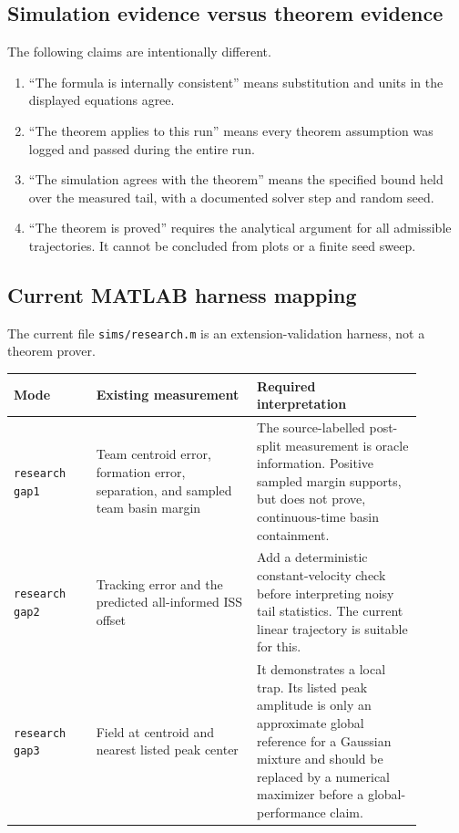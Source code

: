 \documentclass[11pt]{article}
\begin{document}
\subsection{Simulation evidence versus theorem evidence}

The following claims are intentionally different.
\begin{enumerate}
    \item ``The formula is internally consistent'' means substitution and units in the displayed equations agree.
    \item ``The theorem applies to this run'' means every theorem assumption was logged and passed during the entire run.
    \item ``The simulation agrees with the theorem'' means the specified bound held over the measured tail, with a documented solver step and random seed.
    \item ``The theorem is proved'' requires the analytical argument for all admissible trajectories. It cannot be concluded from plots or a finite seed sweep.
\end{enumerate}

\subsection{Current MATLAB harness mapping}\label{sec:code-mapping}

The current file \texttt{sims/research.m} is an extension-validation harness, not a theorem prover.
\begin{center}
\begin{tabular}{p{0.18\linewidth}p{0.35\linewidth}p{0.36\linewidth}}
\hline
Mode & Existing measurement & Required interpretation \\
\hline
\texttt{research gap1} & Team centroid error, formation error, separation, and sampled team basin margin & The source-labelled post-split measurement is oracle information. Positive sampled margin supports, but does not prove, continuous-time basin containment. \\
\texttt{research gap2} & Tracking error and the predicted all-informed ISS offset & Add a deterministic constant-velocity check before interpreting noisy tail statistics. The current linear trajectory is suitable for this. \\
\texttt{research gap3} & Field at centroid and nearest listed peak center & It demonstrates a local trap. Its listed peak amplitude is only an approximate global reference for a Gaussian mixture and should be replaced by a numerical maximizer before a global-performance claim. \\
\hline
\end{tabular}
\end{center}
\end{document}
